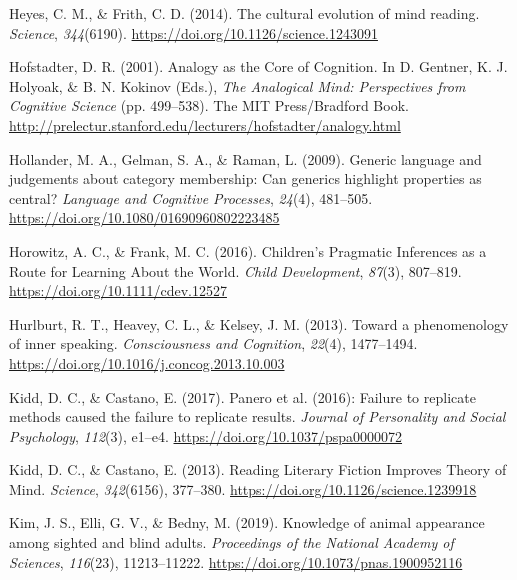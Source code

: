 \documentclass[11pt,man]{article}
\newenvironment{CSLReferences}%
  {}%
  {\par}
\begin{document}
\begin{CSLReferences}{1}{0}
\leavevmode{}%
Heyes, C. M., \& Frith, C. D. (2014). The cultural evolution of mind
reading. \emph{Science}, \emph{344}(6190).
\url{https://doi.org/10.1126/science.1243091}

\leavevmode{}%
Hofstadter, D. R. (2001). Analogy as the {Core} of {Cognition}. In D.
Gentner, K. J. Holyoak, \& B. N. Kokinov (Eds.), \emph{The {Analogical
Mind}: {Perspectives} from {Cognitive Science}} (pp. 499--538). {The MIT
Press/Bradford Book}.
\url{http://prelectur.stanford.edu/lecturers/hofstadter/analogy.html}

\leavevmode{}%
Hollander, M. A., Gelman, S. A., \& Raman, L. (2009). Generic language
and judgements about category membership: {Can} generics highlight
properties as central? \emph{Language and Cognitive Processes},
\emph{24}(4), 481--505. \url{https://doi.org/10.1080/01690960802223485}

\leavevmode{}%
Horowitz, A. C., \& Frank, M. C. (2016). Children's {Pragmatic
Inferences} as a {Route} for {Learning About} the {World}. \emph{Child
Development}, \emph{87}(3), 807--819.
\url{https://doi.org/10.1111/cdev.12527}

\leavevmode{}%
Hurlburt, R. T., Heavey, C. L., \& Kelsey, J. M. (2013). Toward a
phenomenology of inner speaking. \emph{Consciousness and Cognition},
\emph{22}(4), 1477--1494.
\url{https://doi.org/10.1016/j.concog.2013.10.003}

\leavevmode{}%
Kidd, D. C., \& Castano, E. (2017). Panero et al. (2016): {Failure} to
replicate methods caused the failure to replicate results. \emph{Journal
of Personality and Social Psychology}, \emph{112}(3), e1--e4.
\url{https://doi.org/10.1037/pspa0000072}

\leavevmode{}%
Kidd, D. C., \& Castano, E. (2013). Reading {Literary Fiction Improves
Theory} of {Mind}. \emph{Science}, \emph{342}(6156), 377--380.
\url{https://doi.org/10.1126/science.1239918}

\leavevmode{}%
Kim, J. S., Elli, G. V., \& Bedny, M. (2019). Knowledge of animal
appearance among sighted and blind adults. \emph{Proceedings of the
National Academy of Sciences}, \emph{116}(23), 11213--11222.
\url{https://doi.org/10.1073/pnas.1900952116}


\end{CSLReferences}
\end{document}
